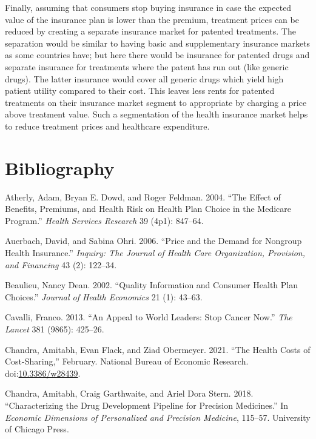 \documentclass[a4paper,12pt]{article}
\begin{document}
Finally, assuming that consumers stop buying insurance in case the expected value of the insurance plan is lower than the premium, treatment prices can be reduced by creating a separate insurance market for patented treatments. The separation would be similar to having basic and supplementary insurance markets as some countries have; but here there would be insurance for patented drugs and separate insurance for treatments  where the patent has run out (like generic drugs). The latter insurance would cover all generic drugs which yield high patient utility compared to their cost. This leaves less rents for patented treatments on their insurance market segment to appropriate by charging a price above treatment value. Such a segmentation of the health insurance market helps to reduce treatment prices and healthcare expenditure.

\section{Bibliography}
\label{sec:org3476511}

\hypertarget{citeproc_bib_item_1}{Atherly, Adam, Bryan E. Dowd, and Roger Feldman. 2004. “The Effect of Benefits, Premiums, and Health Risk on Health Plan Choice in the Medicare Program.” \textit{Health Services Research} 39 (4p1): 847–64.}

\hypertarget{citeproc_bib_item_2}{Auerbach, David, and Sabina Ohri. 2006. “Price and the Demand for Nongroup Health Insurance.” \textit{Inquiry: The Journal of Health Care Organization, Provision, and Financing} 43 (2): 122–34.}

\hypertarget{citeproc_bib_item_3}{Beaulieu, Nancy Dean. 2002. “Quality Information and Consumer Health Plan Choices.” \textit{Journal of Health Economics} 21 (1): 43–63.}

\hypertarget{citeproc_bib_item_4}{Cavalli, Franco. 2013. “An Appeal to World Leaders: Stop Cancer Now.” \textit{The Lancet} 381 (9865): 425–26.}

\hypertarget{citeproc_bib_item_5}{Chandra, Amitabh, Evan Flack, and Ziad Obermeyer. 2021. “The Health Costs of Cost-Sharing,” February. National Bureau of Economic Research. doi:\href{https://doi.org/10.3386/w28439}{10.3386/w28439}.}

\hypertarget{citeproc_bib_item_6}{Chandra, Amitabh, Craig Garthwaite, and Ariel Dora Stern. 2018. “Characterizing the Drug Development Pipeline for Precision Medicines.” In \textit{Economic Dimensions of Personalized and Precision Medicine}, 115–57. University of Chicago Press.}
\end{document}
